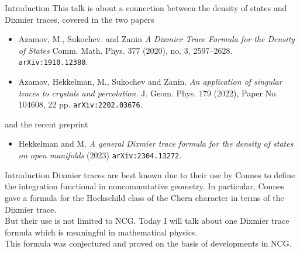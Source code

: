 \documentclass{beamer}
\numberwithin{equation}{section}
\theoremstyle{plain}
\theoremstyle{plain}
\theoremstyle{definition}
\theoremstyle{plain}
\theoremstyle{plain}
\theoremstyle{definition}
\newcommand{\tr}{{\rm Tr}}
\newcommand{\Vol}{\mathrm{Vol}}
\newcommand{\Rl}{\mathbb{R}}
\begin{document}
\begin{frame}{Introduction}
This talk is about a connection between the density of states and Dixmier traces, covered in the two papers
\begin{itemize}
\item{} Azamov, M., Sukochev. and Zanin \emph{A Dixmier Trace Formula for the Density of States} Comm. Math. Phys. 377 (2020), no. 3, 2597–2628.  \texttt{arXiv:1910.12380}.
\item{} Azamov, Hekkelman, M., Sukochev and Zanin. \emph{An application of singular traces to crystals and percolation.} J. Geom. Phys. 179 (2022), Paper No. 104608, 22 pp. \texttt{arXiv:2202.03676}.
\end{itemize}
and the recent preprint
\begin{itemize}
\item{} Hekkelman and M. \emph{A general Dixmier trace formula for the density of states on open manifolds} (2023) \texttt{arXiv:2304.13272}.
\end{itemize}

% 
% 
% 

% 

\end{frame}

\begin{frame}{Introduction}
    Dixmier traces are best known due to their use by Connes to define the integration functional in noncommutative geometry. In particular, Connes gave a formula for the Hochschild class of the Chern character in terms of the Dixmier trace. \\
    \pause
    But their use is not limited to NCG. Today I will talk about one Dixmier trace formula which is meaningful in mathematical physics. \\
    \pause
    This formula was conjectured and proved on the basis of developments in NCG.
\end{frame}
\end{document}
